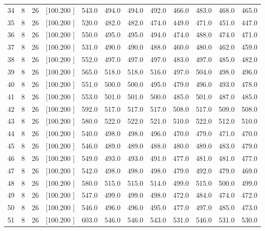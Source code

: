 \documentclass[12pt,a4paper]{article}
\begin{document}
\begin{center}
{\begin{tabular}{r r r r r r r r r r r r}
  34&  8& 26&[100.200   ]&   543.0&   494.0&   494.0&   492.0&   466.0&   483.0&   468.0&   465.0\\[-0.02in]
  35&  8& 26&[100.200   ]&   520.0&   482.0&   482.0&   474.0&   449.0&   471.0&   451.0&   447.0\\[-0.02in]
  36&  8& 26&[100.200   ]&   550.0&   495.0&   495.0&   494.0&   474.0&   488.0&   474.0&   471.0\\[-0.02in]
  37&  8& 26&[100.200   ]&   531.0&   490.0&   490.0&   488.0&   460.0&   480.0&   462.0&   459.0\\[-0.02in]
  38&  8& 26&[100.200   ]&   552.0&   497.0&   497.0&   497.0&   483.0&   497.0&   485.0&   482.0\\[-0.02in]
  39&  8& 26&[100.200   ]&   565.0&   518.0&   518.0&   516.0&   497.0&   504.0&   498.0&   496.0\\[-0.02in]
  40&  8& 26&[100.200   ]&   551.0&   500.0&   500.0&   495.0&   479.0&   496.0&   493.0&   478.0\\[-0.02in]
  41&  8& 26&[100.200   ]&   553.0&   501.0&   501.0&   500.0&   485.0&   501.0&   487.0&   485.0\\[-0.02in]
  42&  8& 26&[100.200   ]&   592.0&   517.0&   517.0&   517.0&   508.0&   517.0&   509.0&   508.0\\[-0.02in]
  43&  8& 26&[100.200   ]&   580.0&   522.0&   522.0&   521.0&   510.0&   522.0&   512.0&   510.0\\[-0.02in]
  44&  8& 26&[100.200   ]&   540.0&   498.0&   498.0&   496.0&   470.0&   479.0&   471.0&   470.0\\[-0.02in]
  45&  8& 26&[100.200   ]&   546.0&   489.0&   489.0&   488.0&   480.0&   489.0&   483.0&   479.0\\[-0.02in]
  46&  8& 26&[100.200   ]&   549.0&   493.0&   493.0&   491.0&   477.0&   481.0&   481.0&   477.0\\[-0.02in]
  47&  8& 26&[100.200   ]&   542.0&   498.0&   498.0&   498.0&   479.0&   492.0&   479.0&   469.0\\[-0.02in]
  48&  8& 26&[100.200   ]&   580.0&   515.0&   515.0&   514.0&   499.0&   515.0&   500.0&   499.0\\[-0.02in]
  49&  8& 26&[100.200   ]&   547.0&   499.0&   499.0&   498.0&   472.0&   484.0&   474.0&   472.0\\[-0.02in]
  50&  8& 26&[100.200   ]&   546.0&   496.0&   496.0&   495.0&   477.0&   497.0&   485.0&   473.0\\[-0.02in]
  51&  8& 26&[100.200   ]&   603.0&   546.0&   546.0&   543.0&   531.0&   546.0&   531.0&   530.0\\[-0.02in]

\end{tabular}}
\end{center}
\end{document}

